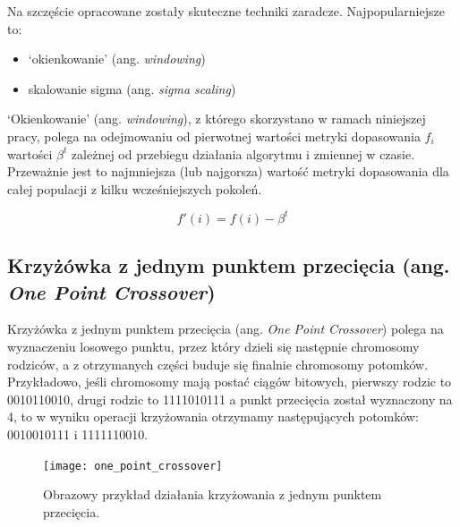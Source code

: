 \documentclass[a4paper,11pt]{article}
\begin{document}
    \bigskip

    \noindent
    \begin{minipage}[H]{\textwidth}
        \setlength\parindent{17pt} Na szczęście opracowane zostały skuteczne techniki zaradcze. Najpopularniejsze to:
        \begin{itemize}
            \item `okienkowanie' (ang. \textit{windowing})
            \item skalowanie sigma (ang. \textit{sigma scaling})
        \end{itemize}
    \end{minipage}

    \bigskip

    `Okienkowanie' (ang. \textit{windowing}), z którego skorzystano w ramach niniejszej pracy, polega na odejmowaniu od pierwotnej wartości metryki dopasowania  $f_{i}$ wartości $\beta^{t}$ zależnej od przebiegu działania algorytmu i zmiennej w czasie. Przeważnie jest to najmniejsza (lub najgorsza) wartość metryki dopasowania dla całej populacji z kilku wcześniejszych pokoleń\cite{IntroductionToEvolutionaryComputing2015}.

    \bigskip

    \begin{equation}
        \label{eq:new_fitness}
        f'(i) = f(i) - \beta^{t}
    \end{equation}

    \subsection{Krzyżówka z jednym punktem przecięcia (ang. \textit{One Point Crossover})}

    Krzyżówka z jednym punktem przecięcia (ang. \textit{One Point Crossover}) polega na wyznaczeniu losowego punktu, przez który dzieli się następnie chromosomy rodziców, a z otrzymanych części buduje się finalnie chromosomy potomków. Przykładowo, jeśli chromosomy mają postać ciągów bitowych, pierwszy rodzic to 0010110010, drugi rodzic to 1111010111 a punkt przecięcia został wyznaczony na 4, to w wyniku operacji krzyżowania otrzymamy następujących potomków: 0010010111 i 1111110010\cite{GeneticAlgorithmEssentials2017}.

    \bigskip

    \begin{figure}[H]
        \label{fig:one_point_crossover}
        \centering
        \texttt{[image: one\_point\_crossover]}
        \caption{Obrazowy przykład działania krzyżowania z jednym punktem przecięcia.}
    \end{figure}
\end{document}
